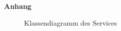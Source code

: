 \cleardoublepage{}
\LARGE \textbf{Anhang}
\par
\normalsize

\begin{figure}
    \caption{Klassendiagramm des Services}\label{fig:class_diagram}
\end{figure}